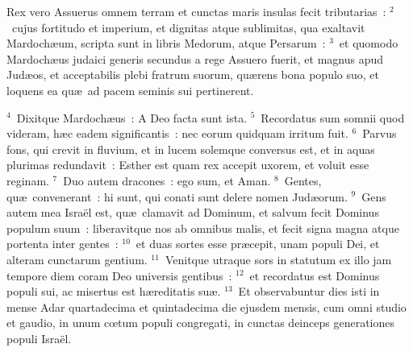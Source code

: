 \lettrine[lines=3,image=true,loversize=0.05,lraise=-0.03]{R}{}ex vero Assuerus omnem terram et cunctas maris insulas fecit tributarias~:
${}^{2}$~cujus fortitudo et imperium, et dignitas atque sublimitas, qua exaltavit Mardoch\ae um, scripta sunt in libris Medorum, atque Persarum~:
${}^{3}$~et quomodo Mardoch\ae us judaici generis secundus a rege Assuero fuerit, et magnus apud Jud\ae os, et acceptabilis plebi fratrum suorum, qu\ae rens bona populo suo, et loquens ea qu\ae\ ad pacem seminis sui pertinerent.


${}^{4}$~Dixitque Mardoch\ae us~: A Deo facta sunt ista.
${}^{5}$~Recordatus sum somnii quod videram, h\ae c eadem significantis~: nec eorum quidquam irritum fuit.
${}^{6}$~Parvus fons, qui crevit in fluvium, et in lucem solemque conversus est, et in aquas plurimas redundavit~: Esther est quam rex accepit uxorem, et voluit esse reginam.
${}^{7}$~Duo autem dracones~: ego sum, et Aman.
${}^{8}$~Gentes, qu\ae\ convenerant~: hi sunt, qui conati sunt delere nomen Jud\ae orum.
${}^{9}$~Gens autem mea Isra\"el est, qu\ae\ clamavit ad Dominum, et salvum fecit Dominus populum suum~: liberavitque nos ab omnibus malis, et fecit signa magna atque portenta inter gentes~:
${}^{10}$~et duas sortes esse pr\ae cepit, unam populi Dei, et alteram cunctarum gentium.
${}^{11}$~Venitque utraque sors in statutum ex illo jam tempore diem coram Deo universis gentibus~:
${}^{12}$~et recordatus est Dominus populi sui, ac misertus est h\ae reditatis su\ae .
${}^{13}$~Et observabuntur dies isti in mense Adar quartadecima et quintadecima die ejusdem mensis, cum omni studio et gaudio, in unum cœtum populi congregati, in cunctas deinceps generationes populi Isra\"el.

